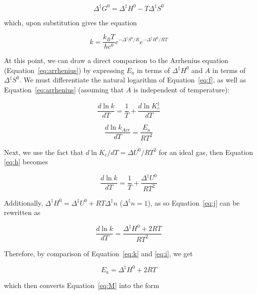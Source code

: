 \begin{equation}
  \Delta^\ddagger G^0 = \Delta^\ddagger H^0 - T \Delta^\ddagger S^0
\end{equation}

\noindent which, upon substitution gives the equation

\begin{equation}
  k = \frac{k_B T}{hc^0} e^{-\Delta^\ddagger S^0/R} e^{-\Delta^\ddagger H^0/RT}
\label{eq:M}
\end{equation}

At this point, we can draw a direct comparison to the Arrhenius equation (Equation~\ref{eq:arrhenius}) by expressing $E_a$ in terms of $\Delta^\ddagger H^0$ and $A$ in terms of $\Delta^\ddagger S^0$.  We must differentiate the natural logarithm of Equation~\ref{eq:f}, as well as Equation~\ref{eq:arrhenius} (assuming that $A$ is independent of temperature):

\begin{equation}
  \frac{d \ln k}{dT} = \frac{1}{T} + \frac{d \ln K_c^\ddagger}{dT}
  \label{eq:h}
\end{equation}

\begin{equation}
  \frac{d \ln k_{Arr}}{dT} = \frac{E_a}{RT^2}
  \label{eq:i}
\end{equation}

\noindent Next, we use the fact that $d \ln K_c / dT = \Delta U^0/RT^2$ for an ideal gas, then Equation \ref{eq:h}  becomes

\begin{equation}
  \frac{d \ln k}{dT} = \frac{1}{T} + \frac{\Delta ^\ddagger U^0}{RT^2}
  \label{eq:j}
\end{equation}

\noindent Additionally, $\Delta ^\ddagger H^0 = \Delta ^\ddagger U^0 + RT \Delta^\ddagger n$ ($\Delta^\ddagger n = 1$), as so Equation~\ref{eq:j} can be rewritten as

\begin{equation}
  \frac{d \ln k}{dT} = \frac{\Delta ^\ddagger H^0 + 2RT}{RT^2}
  \label{eq:k}
\end{equation}

\noindent Therefore, by comparison of Equation~\ref{eq:k} and \ref{eq:i}, we get

\begin{equation}
  E_a = \Delta^\ddagger H^0 + 2RT
  \label{eq:Ea-vs-dH}
\end{equation}

\noindent which then converts Equation~\ref{eq:M} into the form


